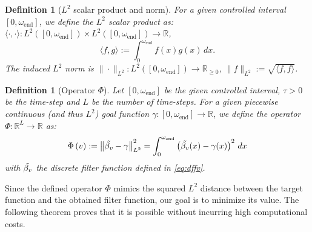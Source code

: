 \documentclass[a4paper,11pt,bibliography=totoc,listof=totoc,headinclude=true,cleardoublepage=empty,oneside]{scrbook}
\newtheorem{definition}[theorem]{Definition}
\newcommand{\R}{\mathbb{R}}
\newcommand{\e}{\mathrm{end}}
\begin{document}
\begin{definition}[$L^2$ scalar product and norm]
    For a given controlled interval $[0, \omega_\e]$, we define the $L^2$ scalar product as: $\langle \cdot, \cdot \rangle : L^2\left([0, \omega_\e]\right) \times L^2\left([0, \omega_\e]\right) \rightarrow \R$, 
    \begin{equation*}
        \langle f, g\rangle := \int_0^{\omega_\e} f(x)g(x) \, dx.
    \end{equation*}
    The induced $L^2$ norm is $\| \cdot \|_{L^2}: L^2\left([0, \omega_\e]\right)  \rightarrow \R_{\geqslant 0}$, $\|f\|_{L^2} := \sqrt{\langle f, f \rangle}$.

\end{definition}
\begin{definition}[Operator $\Phi$]\label{def:Phi}
    Let $[0, \omega_\e]$ be the given controlled interval, $\tau > 0$ be the time-step and $L$ be the number of time-steps. For a given piecewise continuous (and thus $L^2$) goal function $\gamma : [0, \omega_\e] \rightarrow \R$, we define the operator $\Phi :\R^L \rightarrow \R $ as:
    \begin{align*}
        \Phi\left(v\right) := \left\| \Tilde{\beta_v} - \gamma \right\|_{L^2}^2 = \int_0^{\omega_\e} \left(\Tilde{\beta_v}(x) - \gamma(x) \right)^2 \, dx
    \end{align*}
    with $\Tilde{\beta_v}$ the discrete filter function defined in \eqref{eq:dffv}.
\end{definition} 

Since the defined operator $\Phi$ mimics the squared $L^2$ distance between the target function and the obtained filter function, our goal is to minimize its value. The following theorem proves that it is possible without incurring high computational costs.
\end{document}
